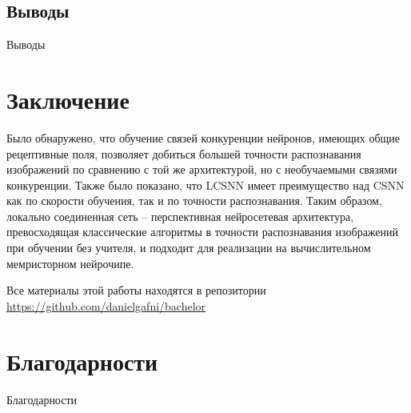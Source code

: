 \documentclass[a4paper]{article}
\begin{document}
\subsection{Выводы}
Выводы 

\clearpage

\section{Заключение}
Было обнаружено, что обучение связей конкуренции нейронов, имеющих общие рецептивные поля, позволяет добиться большей точности распознавания изображений по сравнению с той же архитектурой, но с необучаемыми связями конкуренции. Также было показано, что LCSNN имеет преимущество над CSNN как по скорости обучения, так и по точности распознавания. Таким образом, локально соединенная сеть – перспективная нейросетевая архитектура, превосходящая классические алгоритмы в точности распознавания изображений при обучении без учителя, и подходит для реализации на вычислительном мемристорном нейрочипе.\\

\begin{center}
Все материалы этой работы находятся в репозитории\\
\href{https://github.com/danielgafni/bachelor}{https://github.com/danielgafni/bachelor}
\end{center}

\clearpage


\section{Благодарности}
Благодарности
\clearpage

\printbibliography
\end{document}
